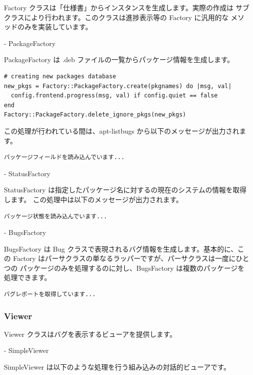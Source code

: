 \documentclass[mingoth,a4paper]{jsarticle}
\begin{document}
Factory クラスは「仕様書」からインスタンスを生成します。実際の作成は
サブクラスにより行われます。このクラスは進捗表示等の Factory に汎用的な
メソッドのみを実装しています。

- PackageFactory

PackageFactory は .deb ファイルの一覧からパッケージ情報を生成します。

\begin{verbatim}
# creating new packages database
new_pkgs = Factory::PackageFactory.create(pkgnames) do |msg, val|
  config.frontend.progress(msg, val) if config.quiet == false
end
Factory::PackageFactory.delete_ignore_pkgs(new_pkgs)
\end{verbatim}

この処理が行われている間は、apt-listbugs から以下のメッセージが出力されます。

\begin{verbatim}
パッケージフィールドを読み込んでいます...
\end{verbatim}

- StatusFactory

StatusFactory は指定したパッケージ名に対するの現在のシステムの情報を取得します。
この処理中は以下のメッセージが出力されます。

\begin{verbatim}
パッケージ状態を読み込んでいます...
\end{verbatim}

- BugsFactory

BugsFactory は Bug クラスで表現されるバグ情報を生成します。基本的に、この
Factory はパーサクラスの単なるラッパーですが、パーサクラスは一度にひとつの
パッケージのみを処理するのに対し、BugsFactory は複数のパッケージを処理できます。

\begin{verbatim}
バグレポートを取得しています...
\end{verbatim}

\subsubsection{Viewer}

Viewer クラスはバグを表示するビューアを提供します。

- SimpleViewer

SimpleViewer は以下のような処理を行う組み込みの対話的ビューアです。
\end{document}
